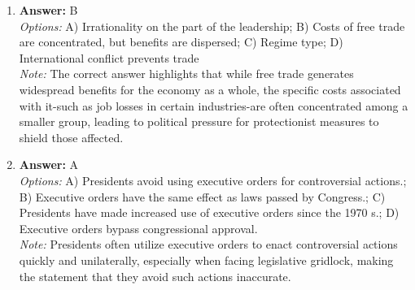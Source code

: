 \documentclass[12pt]{article}
\begin{document}
\begin{enumerate}[label=\arabic*.]
\item \textbf{Answer:} B
\\ \textit{Options:} A) Irrationality on the part of the leadership; B) Costs of free trade are concentrated, but benefits are dispersed; C) Regime type; D) International conflict prevents trade
\\ \textit{Note:} The correct answer highlights that while free trade generates widespread benefits for the economy as a whole, the specific costs associated with it-such as job losses in certain industries-are often concentrated among a smaller group, leading to political pressure for protectionist measures to shield those affected.
\item \textbf{Answer:} A
\\ \textit{Options:} A) Presidents avoid using executive orders for controversial actions.; B) Executive orders have the same effect as laws passed by Congress.; C) Presidents have made increased use of executive orders since the 1970 s.; D) Executive orders bypass congressional approval.
\\ \textit{Note:} Presidents often utilize executive orders to enact controversial actions quickly and unilaterally, especially when facing legislative gridlock, making the statement that they avoid such actions inaccurate.
\end{enumerate}
\end{document}
